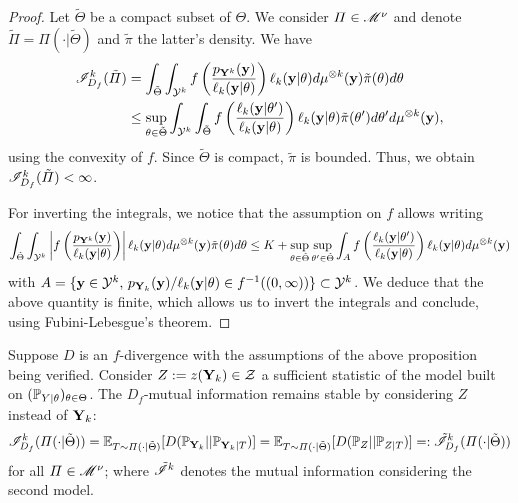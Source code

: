 \begin{proof}
    Let $\tilde\Theta$ be a compact subset of $\Theta$. We consider $\varPi\in\mathscr{M}^\nu$ and denote $\tilde\varPi=\varPi(\cdot|\tilde\Theta)$ and  $\tilde\pi$ the latter's density. We have
        \begin{equation}
        \begin{aligned}
            \mathscr{I}^k_{D_f}(\tilde\varPi) &= \int_{\tilde\Theta}\int_{\mathcal{Y}^k} f\left( \frac{p_{\mathbf{Y}^k}(\mathbf{y})}{\ell_k(\mathbf{y}|\theta)}\right)\ell_k(\mathbf{y}|\theta) d\mu^{\otimes k}(\mathbf{y}) \tilde\pi(\theta)d\theta \\
                &\leq \sup_{\theta\in\tilde\Theta}\int_{\mathcal{Y}^k} \int_{\tilde\Theta} f\left( \frac{\ell_k(\mathbf{y}|\theta')}{\ell_k(\mathbf{y}|\theta)}\right)\ell_k(\mathbf{y}|\theta) \tilde\pi(\theta')d\theta' d\mu^{\otimes k}(\mathbf{y}) ,
        \end{aligned}
        \end{equation}
        using the convexity of $f$. Since $\tilde\Theta$ is compact, $\tilde\pi$ is bounded. Thus, we obtain $\mathscr{I}^k_{D_f}(\tilde\varPi)<\infty$.

        For inverting the integrals, we notice that the assumption on $f$ allows writing 
        \begin{equation}
            \int_{\tilde\Theta}\int_{\mathcal{Y}^k} \left|f\left( \frac{p_{\mathbf{Y}^k}(\mathbf{y})}{\ell_k(\mathbf{y}|\theta)}\right)\right|\ell_k(\mathbf{y}|\theta) d\mu^{\otimes k}(\mathbf{y}) \tilde\pi(\theta)d\theta \leq K + \sup_{\theta\in\tilde\Theta}\sup_{\theta'\in\tilde\Theta} \int_{A} f\left(\frac{\ell_k(\mathbf{y}|\theta')}{\ell_k(\mathbf{y}|\theta)}  \right) \ell_k(\mathbf{y}|\theta) d\mu^{\otimes k}(\mathbf{y})
        \end{equation}
        with $A=\{\mathbf{y}\in\mathcal{Y}^k,\, p_{\mathbf{Y}_k}(\mathbf{y})/\ell_k(\mathbf{y}|\theta)\in f^{-1}((0,\infty)) \}\subset\mathcal{Y}^k $. We deduce that the above quantity is finite, which allows us to invert the integrals and conclude, using Fubini-Lebesgue's theorem.
\end{proof}

\begin{prop}
    Suppose $D$ is an $f$-divergence with the assumptions of the above proposition being verified.
    Consider $Z:=z(\mathbf{Y}_k)\in\mathcal{Z}$ a sufficient statistic of the model built on $(\mathbb{P}_{Y|\theta})_{\theta\in\Theta}$. %
    The $D_f$-mutual information remains stable by considering $Z$ instead of $\mathbf{Y}_k$:
    \begin{equation}
        \mathscr{I}^k_{D_f}(\varPi(\cdot|\tilde\Theta)) = \mathbb{E}_{T\sim\varPi(\cdot|\tilde\Theta)}[D(\mathbb{P}_{\mathbf{Y}_k}||\mathbb{P}_{\mathbf{Y}_k|T} )] = \mathbb{E}_{T\sim\varPi(\cdot|\tilde\Theta)}[D(\mathbb{P}_{Z}||\mathbb{P}_{Z|T} )] =: \tilde{\mathscr{I}}_{D_f}^k(\varPi(\cdot|\tilde\Theta))
    \end{equation}
    for all $\varPi\in\mathscr{M}^\nu$; where $\tilde{\mathscr{I}}^k$ denotes the mutual information considering the second model.
\end{prop}

